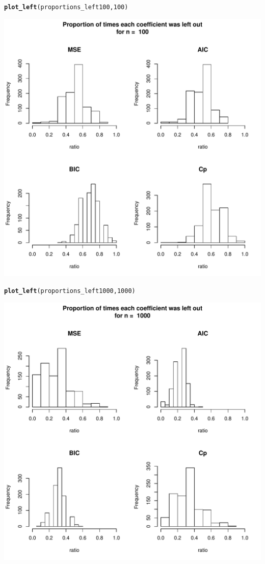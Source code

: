 \documentclass[11pt]{article}\usepackage[]{graphicx}\usepackage[]{color}
\makeatletter
\def\maxwidth{ %
  \ifdim\Gin@nat@width>\linewidth
    \linewidth
  \else
    \Gin@nat@width
  \fi
}
\newcommand{\hlnum}[1]{\textcolor[rgb]{0.686,0.059,0.569}{#1}}%
\newcommand{\hlstd}[1]{\textcolor[rgb]{0.345,0.345,0.345}{#1}}%
\newcommand{\hlkwd}[1]{\textcolor[rgb]{0.737,0.353,0.396}{\textbf{#1}}}%
\newenvironment{kframe}{%
 \def\at@end@of@kframe{}%
 \ifinner\ifhmode%
  \def\at@end@of@kframe{\end{minipage}}%
  \begin{minipage}{\columnwidth}%
 \fi\fi%
 \def\FrameCommand##1{\hskip\@totalleftmargin \hskip-\fboxsep
 \colorbox{shadecolor}{##1}\hskip-\fboxsep
     \hskip-\linewidth \hskip-\@totalleftmargin \hskip\columnwidth}%
 \MakeFramed {\advance\hsize-\width
   \@totalleftmargin\z@ \linewidth\hsize
   \@setminipage}}%
 {\par\unskip\endMakeFramed%
 \at@end@of@kframe}
\newenvironment{knitrout}{}{} %
\makeatother
\begin{document}
\begin{knitrout}
\begin{kframe}
\begin{alltt}
\hlkwd{plot_left}\hlstd{(proportions_left100,}\hlnum{100}\hlstd{)}
\end{alltt}
\end{kframe}
\includegraphics[width=\maxwidth]{figure/unnamed-chunk-6-3} 
\begin{kframe}\begin{alltt}
\hlkwd{plot_left}\hlstd{(proportions_left1000,}\hlnum{1000}\hlstd{)}
\end{alltt}
\end{kframe}
\includegraphics[width=\maxwidth]{figure/unnamed-chunk-6-4} 

\end{knitrout}
\end{document}
